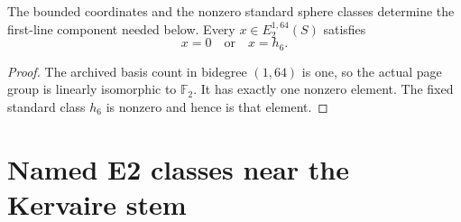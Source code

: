\begin{theorem}
\label{sem:Computation:h6-line}
The bounded coordinates and the nonzero standard sphere classes determine
the first-line component needed below. Every $x\in E_2^{1,64}(S)$ satisfies
\[
x=0\quad\text{or}\quad x=h_6.
\]
\end{theorem}
\begin{proof}
The archived basis count in bidegree $(1,64)$ is one, so the actual page
group is linearly isomorphic to $\mathbb F_2$. It has exactly one nonzero
element. The fixed standard class $h_6$ is nonzero and hence is that
element.
\end{proof}

\section{Named E2 classes near the Kervaire stem}


